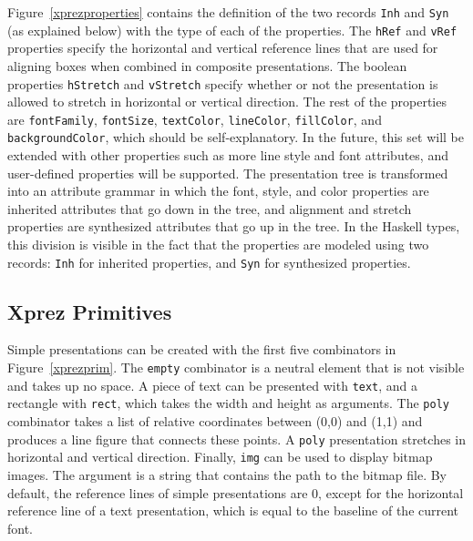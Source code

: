 \noindent Figure~\ref{xprezproperties} contains the definition of the two records \texttt{Inh} and \texttt{Syn} (as explained below) with the type of each of the properties. The \texttt{hRef} and \texttt{vRef} properties specify the horizontal and vertical reference lines that are used for aligning boxes when combined in composite presentations. The boolean properties \texttt{hStretch} and \texttt{vStretch} specify whether or not the presentation is allowed to stretch in horizontal or vertical direction. The rest of the properties are \texttt{fontFamily}, \texttt{fontSize}, \texttt{textColor}, \texttt{lineColor}, \texttt{fillColor}, and \texttt{backgroundColor}, which should be self-explanatory. In the future, this set will be extended with other properties such as more line style and font attributes, and user-defined properties will be supported. The presentation tree is transformed into an attribute grammar in which the font, style, and color properties are inherited attributes that go down in the tree, and alignment and stretch properties are synthesized attributes that go up in the tree. In the Haskell types, this division is visible in the fact that the properties are modeled using two records: \texttt{Inh} for inherited properties, and \texttt{Syn} for synthesized properties.


%																
\subsection{{\sc Xprez} Primitives} \label{primitives}

Simple presentations can be created with the first five combinators in Figure~\ref{xprezprim}. The \texttt{empty} combinator is a neutral element that is not visible and takes up no space. A piece of text can be presented with \texttt{text}, and a rectangle with \texttt{rect}, which takes the width and height as arguments. The \texttt{poly} combinator takes a list of relative coordinates between (0,0) and (1,1) and produces a line figure that connects these points. A \texttt{poly} presentation stretches in horizontal and vertical direction. Finally, \texttt{img} can be used to display bitmap images. The argument is a string that contains the path to the bitmap file. By default, the reference lines of simple presentations are 0, except for the horizontal reference line of a text presentation, which is equal to the baseline of the current font.

